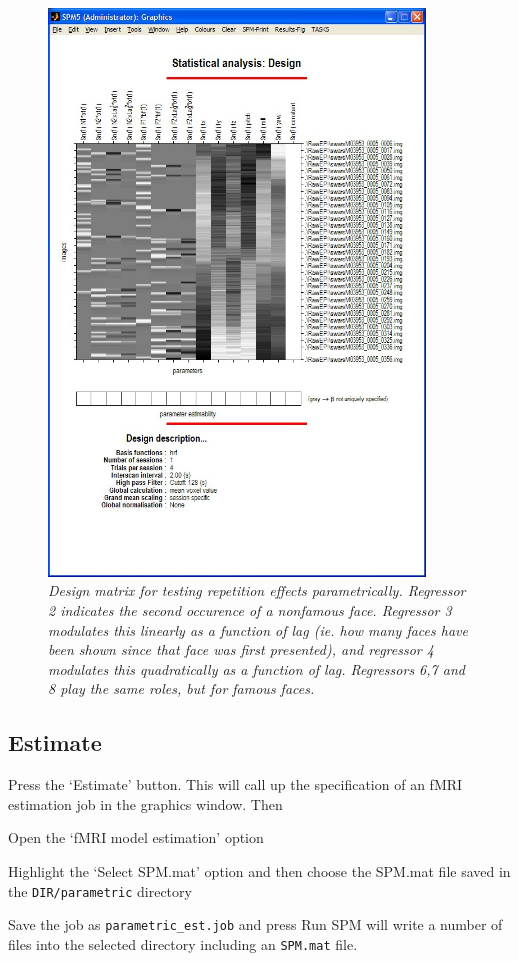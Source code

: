 \begin{figure}
\begin{center}
\includegraphics[width=100mm]{faces/par_design}
\caption{\em Design matrix for testing repetition effects parametrically. Regressor 2 indicates the second occurence of a nonfamous face. Regressor 3 modulates this linearly as a function of lag (ie. how many faces have been shown since that face was first presented), and regressor 4 modulates this quadratically as a function of lag. Regressors 6,7 and 8 play the same roles, but for famous faces. \label{par_design} }
\end{center}
\end{figure}

\subsection{Estimate}

Press the `Estimate' button. This will call up the specification of an fMRI estimation job in the graphics window. Then
\bi
\item{Open the `fMRI model estimation' option}
\item{Highlight the `Select SPM.mat' option and then choose the SPM.mat
file saved in the \verb!DIR/parametric! directory}
\item{Save the job as \verb!parametric_est.job! and press Run}
\ei
SPM will write a number of files into the selected directory including 
an \verb!SPM.mat! file.

